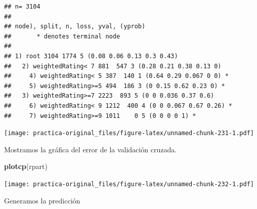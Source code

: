 \documentclass[spanish,]{article}
\newenvironment{Shaded}{\begin{snugshade}}{\end{snugshade}}
\newcommand{\KeywordTok}[1]{\textcolor[rgb]{0.13,0.29,0.53}{\textbf{#1}}}
\newcommand{\DataTypeTok}[1]{\textcolor[rgb]{0.13,0.29,0.53}{#1}}
\newcommand{\StringTok}[1]{\textcolor[rgb]{0.31,0.60,0.02}{#1}}
\newcommand{\CommentTok}[1]{\textcolor[rgb]{0.56,0.35,0.01}{\textit{#1}}}
\newcommand{\OperatorTok}[1]{\textcolor[rgb]{0.81,0.36,0.00}{\textbf{#1}}}
\newcommand{\NormalTok}[1]{#1}
\begin{document}
\begin{verbatim}
## n= 3104 
## 
## node), split, n, loss, yval, (yprob)
##       * denotes terminal node
## 
## 1) root 3104 1774 5 (0.08 0.06 0.13 0.3 0.43)  
##   2) weightedRating< 7 881  547 3 (0.28 0.21 0.38 0.13 0)  
##     4) weightedRating< 5 387  140 1 (0.64 0.29 0.067 0 0) *
##     5) weightedRating>=5 494  186 3 (0 0.15 0.62 0.23 0) *
##   3) weightedRating>=7 2223  893 5 (0 0 0.036 0.37 0.6)  
##     6) weightedRating< 9 1212  400 4 (0 0 0.067 0.67 0.26) *
##     7) weightedRating>=9 1011    0 5 (0 0 0 0 1) *
\end{verbatim}

\begin{Shaded}
\end{Shaded}

\texttt{[image: practica-original\_files/figure-latex/unnamed-chunk-231-1.pdf]}

Mostramos la gráfica del error de la validación cruzada.

\begin{Shaded}
\begin{Highlighting}[]
\KeywordTok{plotcp}\NormalTok{(rpart)}
\end{Highlighting}
\end{Shaded}

\texttt{[image: practica-original\_files/figure-latex/unnamed-chunk-232-1.pdf]}

Generamos la predicción

\begin{Shaded}
\end{Shaded}
\end{document}
